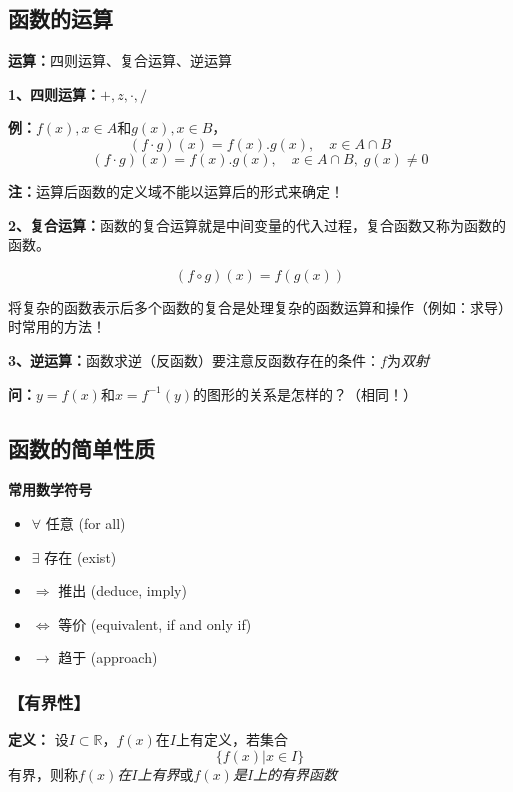 \subsection{函数的运算}

{\bf 运算：}四则运算、复合运算、逆运算	

{\bf 1、四则运算：}$+,z,\cdot,/$

{\bf 例：}$f(x),x\in A$和$g(x),x\in B$，
$$(f\cdot g)(x)=f(x).g(x),\quad x\in A\cap B$$
$$(f\cdot g)(x)=f(x).g(x),\quad x\in A\cap B,\;g(x)\ne 0$$

{\bf 注：}运算后函数的定义域不能以运算后的形式来确定！

{\bf 2、复合运算：}函数的复合运算就是中间变量的代入过程，复合函数又称为函数的函数。

$$(f\circ g)(x)=f(g(x))$$

将复杂的函数表示后多个函数的复合是处理复杂的函数运算和操作（例如：求导）
时常用的方法！

{\bf 3、逆运算：}函数求逆（反函数）要注意反函数存在的条件：$f$为{\it 双射}

{\bf 问：}$y=f(x)$和$x=f^{-1}(y)$的图形的关系是怎样的？（相同！）

\subsection{函数的简单性质}
	
\begin{shaded}
{\bf 常用数学符号}
	\begin{itemize}
	  \item {$\bm{\forall}$} \quad 任意 (for all)
	  \item {$\bm{\exists}$} \quad 存在 (exist)
	  \item {$\bm{\Rightarrow}$} \quad 推出 (deduce, imply)
	  \item {$\bm{\Leftrightarrow}$} \quad 等价 (equivalent, if and only if)
	  \item {$\bm{\to}$} \quad 趋于 (approach)
	\end{itemize}
\end{shaded}

\subsubsection{【有界性】}			

{{\bf 定义：}}
	设$I\subset\mathbb{R}$，$f(x)$在$I$上有定义，若集合
	$$\{f(x)|x\in I\}$$
	有界，则称{\it $f(x)$在$I$上有界}或{\it $f(x)$是$I$上的有界函数}
		
